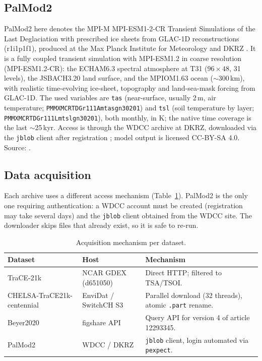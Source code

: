 \documentclass{isprs} %
\newcommand{\tabbr}[1]{\texttt{#1}}
\begin{document}
\subsection{PalMod2}
PalMod2 here denotes the MPI-M MPI-ESM1-2-CR Transient Simulations of the Last Deglaciation with prescribed ice sheets from GLAC-1D reconstructions (r1i1p1f1), produced at the Max Planck Institute for Meteorology and DKRZ \cite{palmod2_data}. It is a fully coupled transient simulation with MPI-ESM1.2 in coarse resolution (MPI-ESM1.2-CR): the ECHAM6.3 spectral atmosphere at T31 ($96\times48$, 31 levels), the JSBACH3.20 land surface, and the MPIOM1.63 ocean ($\sim$300\,km), with realistic time-evolving ice-sheet, topography and land-sea-mask forcing from GLAC-1D. The used variables are \tabbr{tas} (near-surface, usually 2\,m, air temperature; \texttt{PMMXMCRTDGr111\allowbreak Amtasgn30201}) and \tabbr{tsl} (soil temperature by layer; \texttt{PMMXMCRTDGr111\allowbreak Lmtslgn30201}), both monthly, in K; the native time coverage is the last $\sim$25\,kyr. Access is through the WDCC archive at DKRZ, downloaded via the \tabbr{jblob} client after registration \cite{wdcc_jblob}; model output is licensed CC-BY-SA 4.0. Source: \cite{palmod2_data}.

\subsection{Data acquisition}
Each archive uses a different access mechanism (Table~\ref{tab:acq}). PalMod2 is the only one requiring authentication: a WDCC account must be created (registration may take several days) and the \tabbr{jblob} client obtained from the WDCC site. The downloader skips files that already exist, so it is safe to re-run.

\begin{table}[t]
\centering
\small
\begin{tabular}{lll}
\toprule
Dataset          & Host                  & Mechanism \\
\midrule
TraCE-21k        & NCAR GDEX (d651050)   & Direct HTTP; filtered to TSA/TSOI. \\
CHELSA-TraCE21k-centennial  & EnviDat / SwitchCH S3 & Parallel download (32 threads), atomic \tabbr{.part} rename. \\
Beyer2020   & figshare API          & Query API for version 4 of article 12293345. \\
PalMod2          & WDCC / DKRZ           & \tabbr{jblob} client, login automated via \tabbr{pexpect}. \\
\bottomrule
\end{tabular}
\caption{Acquisition mechanism per dataset.}
\label{tab:acq}
\end{table}
\end{document}
